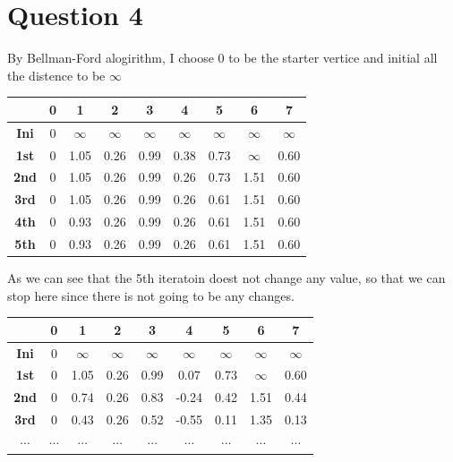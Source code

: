 \documentclass[conference]{IEEEtran}
\begin{document}
\section*{Question 4}
By Bellman-Ford alogirithm, I choose 0 to be the starter vertice and 
initial all the distence to be $\infty$

\begin{table}[H]
    \begin{center}
        \begin{tabular}{|c|c|c|c|c|c|c|c|c|}
            \hline
            \textbf{}    & 0 & 1    & 2    & 3    & 4    & 5    & 6    & 7    \\ \hline
            \textbf{Ini} & 0 & $\infty$ & $\infty$ & $\infty$ & $\infty$ & $\infty$ & $\infty$ & $\infty$ \\ \hline
            \textbf{1st} & 0 & 1.05 & 0.26 & 0.99 & 0.38 & 0.73 & $\infty$ & 0.60 \\ \hline
            \textbf{2nd} & 0 & 1.05 & 0.26 & 0.99 & 0.26 & 0.73 & 1.51 & 0.60 \\ \hline
            \textbf{3rd} & 0 & 1.05 & 0.26 & 0.99 & 0.26 & 0.61 & 1.51 & 0.60 \\ \hline
            \textbf{4th} & 0 & 0.93 & 0.26 & 0.99 & 0.26 & 0.61 & 1.51 & 0.60 \\ \hline
            \textbf{5th} & 0 & 0.93 & 0.26 & 0.99 & 0.26 & 0.61 & 1.51 & 0.60 \\ \hline
            \end{tabular}
    \end{center}
\end{table}

As we can see that the 5th iteratoin doest not change any value, so that we can
stop here since there is not going to be any changes.

\begin{table}[H]
    \begin{center}
        \begin{tabular}{|c|c|c|c|c|c|c|c|c|}
            \hline
            \textbf{}    & 0 & 1    & 2    & 3    & 4     & 5    & 6    & 7    \\ \hline
            \textbf{Ini} & 0 & $\infty$ & $\infty$ & $\infty$ & $\infty$ & $\infty$ & $\infty$ & $\infty$ \\ \hline
            \textbf{1st} & 0 & 1.05 & 0.26 & 0.99 & 0.07  & 0.73 & $\infty$ & 0.60 \\ \hline
            \textbf{2nd} & 0 & 0.74 & 0.26 & 0.83 & -0.24 & 0.42 & 1.51 & 0.44 \\ \hline
            \textbf{3rd} & 0 & 0.43 & 0.26 & 0.52 & -0.55 & 0.11 & 1.35 & 0.13 \\ \hline
            $\cdots$ & $\cdots$&$\cdots$ &$\cdots$ &$\cdots$ & $\cdots$ & $\cdots$ & $\cdots$ & $\cdots$ \\ \hline
            \end{tabular}
    \end{center}
\end{table}
\end{document}
